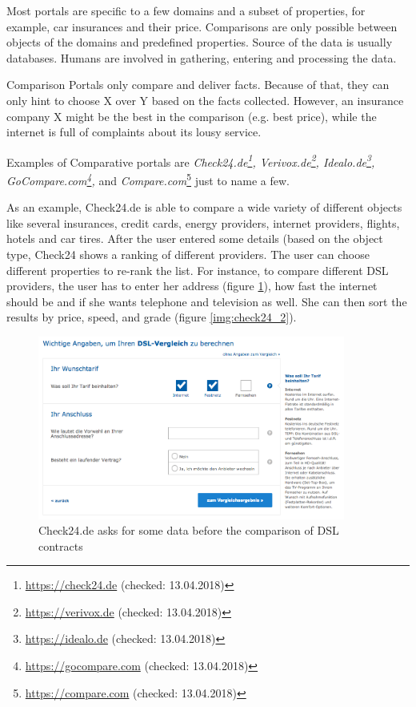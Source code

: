 Most portals are specific to a few domains and a subset of properties, for example, car insurances and their price. Comparisons are only possible between objects of the domains and predefined properties. Source of the data is usually databases. Humans are involved in gathering, entering and processing the data.

Comparison Portals only compare and deliver facts. Because of that, they can only hint to choose X over Y based on the facts collected.  However, an insurance company X might be the best in the comparison (e.g. best price), while the internet is full of complaints about its lousy service.

Examples of Comparative portals are \emph{Check24.de\footnote{\url{https://check24.de} (checked: 13.04.2018)}, Verivox.de\footnote{\url{https://verivox.de} (checked: 13.04.2018)}, Idealo.de\footnote{\url{https://idealo.de} (checked: 13.04.2018)}, GoCompare.com\footnote{\url{https://gocompare.com} (checked: 13.04.2018)},} and \emph{Compare.com}\footnote{\url{https://compare.com} (checked: 13.04.2018)} just to name a few.

As an example, Check24.de is able to compare a wide variety of different objects like several insurances, credit cards, energy providers, internet providers, flights, hotels and car tires. After the user entered some details (based on the object type, Check24 shows a ranking of different providers. The user can choose different properties to re-rank the list.
For instance, to compare different DSL providers, the user has to enter her address (figure  \ref{img:check24_1}), how fast the internet should be and if she wants telephone and television as well. She can then sort the results by price, speed, and grade (figure \ref{img:check24_2}).
\begin{figure}[tbp]
 \centering
	\includegraphics[width=0.9\textwidth]{images/ds-sys/check24_1}
	\caption{Check24.de asks for some data before the comparison of DSL contracts}
		\label{img:check24_1}
\end{figure}

